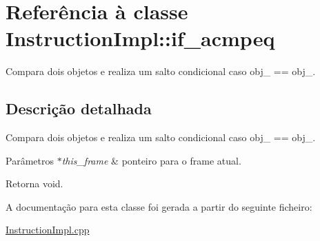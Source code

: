 \hypertarget{class_instruction_impl_1_1if__acmpeq}{}\section{Referência à classe Instruction\+Impl\+:\+:if\+\_\+acmpeq}
\label{class_instruction_impl_1_1if__acmpeq}


Compara dois objetos e realiza um salto condicional caso obj\+\_ == obj\+\_.  




\subsection{Descrição detalhada}
Compara dois objetos e realiza um salto condicional caso obj\+\_ == obj\+\_. 


\begin{DoxyParams}{Parâmetros}
{\em $\ast$this\+\_\+frame} & ponteiro para o frame atual. \\
\hline
\end{DoxyParams}
\begin{DoxyReturn}{Retorna}
void. 
\end{DoxyReturn}


A documentação para esta classe foi gerada a partir do seguinte ficheiro\+:\begin{DoxyCompactItemize}
\item 
\hyperlink{_instruction_impl_8cpp}{Instruction\+Impl.\+cpp}\end{DoxyCompactItemize}
